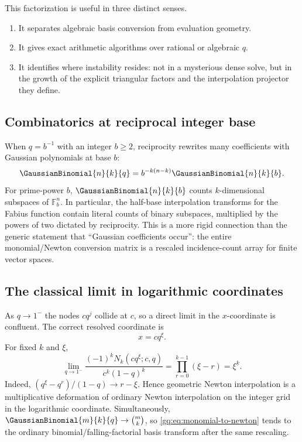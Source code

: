 This factorization is useful in three distinct senses.
\begin{enumerate}
\item It separates algebraic basis conversion from evaluation geometry.
\item It gives exact arithmetic algorithms over rational or algebraic $q$.
\item It identifies where instability resides: not in a mysterious dense
      solve, but in the growth of the explicit triangular factors and the
      interpolation projector they define.
\end{enumerate}

\subsection{Combinatorics at reciprocal integer base}

When $q=b^{-1}$ with an integer $b\ge2$, reciprocity rewrites many
coefficients with Gaussian polynomials at base $b$:
\begin{equation}
 \GaussianBinomial{n}{k}{q}=b^{-k(n-k)}\GaussianBinomial{n}{k}{b}.
 \label{gq:eq:reciprocal-integer-base}
\end{equation}
For prime-power $b$, $\GaussianBinomial{n}{k}{b}$ counts $k$-dimensional subspaces of
$\mathbb F_b^n$.  In particular, the half-base interpolation transforms for
the Fabius function contain literal counts of binary subspaces, multiplied
by the powers of two dictated by reciprocity.  This is a more rigid
connection than the generic statement that ``Gaussian coefficients occur'':
the entire monomial/Newton conversion matrix is a rescaled incidence-count
array for finite vector spaces.

\subsection{The classical limit in logarithmic coordinates}
\label{gq:sec:q-to-one}

As $q\to1^-$ the nodes $cq^j$ collide at $c$, so a direct limit in the
$x$-coordinate is confluent.  The correct resolved coordinate is
\begin{equation}
 x=cq^\xi.
 \label{gq:eq:log-coordinate}
\end{equation}
For fixed $k$ and $\xi$,
\begin{equation}
 \lim_{q\to1^-}
 \frac{(-1)^kN_k(cq^\xi;c,q)}{c^k(1-q)^k}
 =\prod_{r=0}^{k-1}(\xi-r)=\xi^{\underline{k}}.
 \label{gq:eq:q-to-one-falling}
\end{equation}
Indeed, $(q^\xi-q^r)/(1-q)\to r-\xi$.  Hence geometric Newton interpolation
is a multiplicative deformation of ordinary Newton interpolation on the
integer grid in the logarithmic coordinate.  Simultaneously,
$\GaussianBinomial{m}{k}{q}\to\binom mk$, so
\eqref{gq:eq:monomial-to-newton} tends to the ordinary binomial/falling-factorial
basis transform after the same rescaling.

